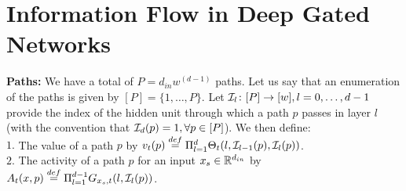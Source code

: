 \section{Information Flow in Deep Gated Networks}
\textbf{Paths:} We have a total of $P=d_{in}w^{(d-1)}$ paths. Let us say that an enumeration of the paths is given by $[P]=\{1,\ldots,P\}$. Let $\mathcal{I}_{l}\colon [P]\rightarrow [w],l=0,\ldots,d-1$ provide the index of the hidden unit through which a path $p$ passes in layer $l$ (with the convention that $\mathcal{I}_d(p)=1,\forall p\in [P]$). We then define:\\
$1.$ The value of a path $p$ by $v_t(p)\stackrel{def}=\Pi_{l=1}^d \Theta_t(l,\mathcal{I}_{l-1}(p),\mathcal{I}_l(p))$.\\
$2.$ The activity of a path $p$ for an input $x_s\in \mathbb{R}^{d_{in}}$ by $A_{t}(x,p)\stackrel{def}{=}\Pi_{l=1}^{d-1} G_{x_s,t}(l,\mathcal{I}_l(p))$.\\
\begin{comment}
\FloatBarrier
\begin{table}[h]
\begin{minipage}{0.5\columnwidth}
\resizebox{\columnwidth}{!}{
\begin{tabular}{|c|l|}\hline								 								 													
NPF		&$\phi_{x,t}=(x(\I_0(p))A_t(x,p) ,p\in[P])\in \R^P$\\\hline	
OASN	&$\lambda_t(x,x')=\sum_{p\rsa i} A_t(x,p) A_t(x',p)$\\\hline
NPK		&$H_t(x,x')=\ip{\phi_{x,t},\phi_{x',t}}$\\\hline		
VTP		&$\varphi^v_{p,t}=(\partial_{\theta}v_t(p),\theta\in\Theta)\inrdnet$ \\\hline	
VG		&$\psi^v_{x,t}=\nabla_{\Theta} \hat{y}_t(x)\in\R^{d_{net}}$\\\hline
\end{tabular}
}
\end{minipage}
\begin{minipage}{0.5\columnwidth}
\resizebox{\columnwidth}{!}{
\begin{tabular}{|c|l|}\hline								 								 													
ATP		&$\varphi^a_{x,p,t}=(\partial_{\tg}A_t(x,p),\tg\in\Tg)\inrdnet$ \\\hline	
FG		&$\psi^{\phi}_{x,t}=\nabla_{\Tg} \hat{y}_t(x)\in\R^{d_{net}}$\\\hline
OSSN 	&$\delta_t(x,x')=\sum_{p\rsa i} \ip{\varphi^a_{x,p,t},\varphi^a_{x',p,t}}$\\\hline
NTF		&$\psi_{x,t}=(\psi^v_{x,t},\psi^{\phi}_{x,t})\in\R^{2d_{net}}$\\\hline
NTK 		&$K_t(x,x')=\ip{\psi_{x,t}\psi_{x',t}}$\\\hline
\end{tabular}
}
\end{minipage}
\caption{Shows all zeroth-order and first-order quantities related to information flow in a DGN.}
\label{tb:terms}
\end{table}
\end{comment}
